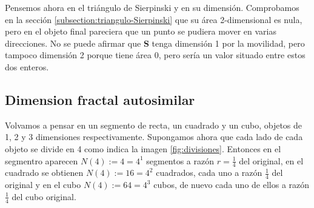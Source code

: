 Pensemos ahora en el triángulo de Sierpinski y en su dimensión. Comprobamos en la sección \ref{subsection:triangulo-Sierpinski} que su área 2-dimensional es nula, pero en el objeto final pareciera que un punto se pudiera mover en varias direcciones. No se puede afirmar que \textbf{S} tenga dimensión 1 por la movilidad, pero tampoco dimensión 2 porque tiene área 0, pero sería un valor situado entre estos dos enteros.

\subsection{Dimension fractal autosimilar}
\label{subsection:dim-frac-autosimilar}

Volvamos a pensar en un segmento de recta, un cuadrado y un cubo, objetos de 1, 2 y 3 dimensiones respectivamente. Supongamos ahora que cada lado de cada objeto se divide en 4 como indica la imagen \ref{fig:divisiones}. Entonces en el segmentro aparecen $N(4):=4=4^1$ segmentos a razón $r=\frac 1 4$ del original, en el cuadrado se obtienen $N(4):=16=4^2$ cuadrados, cada uno a razón $\frac 1 4$ del original y en el cubo $N(4):=64=4^3$ cubos, de nuevo cada uno de ellos a razón $\frac 1 4$ del cubo original.

